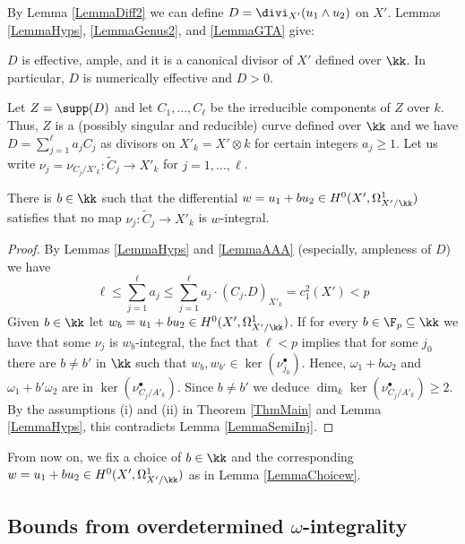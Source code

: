 By Lemma \ref{LemmaDiff2} we can define $D=\divi_{X'}(u_1\wedge u_2)$ on $X'$. Lemmas \ref{LemmaHyps}, \ref{LemmaGenus2},  and \ref{LemmaGTA} give:

 \begin{lemma}
\notready\label{LemmaAAA}  $D$ is effective, ample,  and it is a canonical divisor of $X'$ defined over $\kk$. In particular, $D$ is numerically effective and $D> 0$.
\end{lemma}


Let $Z=\supp(D)$ and let $C_1,...,C_\ell$ be the irreducible components of $Z$ over $k$. Thus, $Z$ is a (possibly singular and reducible) curve defined over $\kk$ and we have $D=\sum_{j=1}^\ell a_j C_j$ as divisors on $X'_k=X'\otimes k$ for certain integers $a_j\ge 1$. Let us write $\nu_j=\nu_{C_j/X'_k}:\widetilde{C}_j\to X'_k$ for $j=1,...,\ell$.

\begin{lemma}
\notready\label{LemmaChoicew} There is $b\in \kk$ such that the differential $w=u_1+bu_2\in H^0(X',\Omega^1_{X'/\kk})$ satisfies that no map $\nu_j:\widetilde{C}_j\to X'_k$ is $w$-integral.
\end{lemma}
\begin{proof} By Lemmas \ref{LemmaHyps} and \ref{LemmaAAA} (especially, ampleness of $D$) we have
$$
\ell \le \sum_{j=1}^\ell a_j \le \sum_{j=1}^\ell a_j\cdot (C_j.D)_{X'_k}=c_1^2(X')<p
$$
Given $b\in \kk$ let $w_b=u_1+bu_2\in H^0(X',\Omega^1_{X'/\kk})$. If for every $b\in \F_p\subseteq \kk$ we have that some $\nu_{j}$ is $w_b$-integral, the fact that $\ell<p$ implies that for some $j_0$ there are $b\ne b'$ in $\kk$ such that $w_b,w_{b'}\in \ker(\nu_{j_0}^\bullet)$. Hence, $\omega_1+b\omega_2$ and $\omega_1+b'\omega_2$ are in $\ker (\nu_{C_j/A'_k}^\bullet)$. Since $b\ne b'$ we deduce $\dim_k \ker (\nu_{C_j/A'_k}^\bullet)\ge 2$. By the assumptions (i) and (ii) in Theorem \ref{ThmMain} and Lemma \ref{LemmaHyps}, this contradicts Lemma \ref{LemmaSemiInj}.
\end{proof}

From now on, we fix a choice of $b\in \kk$ and the corresponding $w=u_1+bu_2\in H^0(X',\Omega^1_{X'/\kk})$ as in Lemma \ref{LemmaChoicew}.





\subsection{Bounds from overdetermined $\omega$-integrality}\label{SecBoundsOver} %

